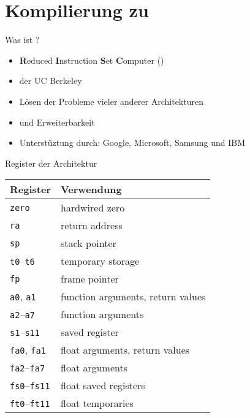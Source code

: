 \section{Kompilierung zu \riscv}
\begin{frame}{Was ist \riscv?}

	\begin{itemize}
		\item<1-> \textbf{R}educed \textbf{I}nstruction \textbf{S}et \textbf{C}omputer ()
		\item<2->  der UC Berkeley
		\item<3-> Lösen der Probleme vieler anderer Architekturen
		\item<4->  und Erweiterbarkeit
		\item<5-> Unterstüztung durch: Google, Microsoft, Samsung und IBM
	\end{itemize}
\end{frame}

\begin{frame}{Register der \riscv{} Architektur}
	\begin{table}
		\centering
		\begin{tabularx}{\linewidth}{L|L}
			 Register & Verwendung                        \\ \hline
			\texttt{zero}               & hardwired zero                    \\ \hline
			\texttt{ra}                 & return address                    \\ \hline
			\texttt{sp}                 & stack pointer                     \\ \hline
			\texttt{t0}--\texttt{t6}    & temporary storage                 \\ \hline
			\texttt{fp}                 & frame pointer                     \\ \hline
			\texttt{a0}, \texttt{a1}    & function arguments, return values \\ \hline
			\texttt{a2}--\texttt{a7}    & function arguments                \\ \hline
			\texttt{s1}--\texttt{s11}   & saved register                    \\ \hline
			\texttt{fa0}, \texttt{fa1}  & float arguments, return values    \\ \hline
			\texttt{fa2}--\texttt{fa7}  & float arguments                   \\ \hline
			\texttt{fs0}--\texttt{fs11} & float saved registers             \\ \hline
			\texttt{ft0}--\texttt{ft11} & float temporaries                 \\
		\end{tabularx}
	\end{table}
\end{frame}


